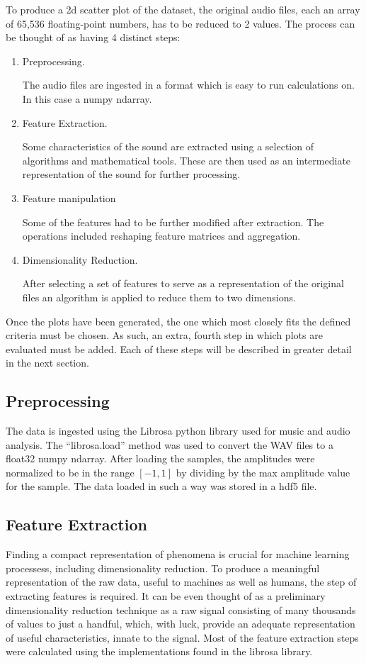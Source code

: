 \documentclass[11pt]{article}
\begin{document}
To produce a 2d scatter plot of the dataset, the original audio files, each an array of 65,536 floating-point numbers, has to be reduced to 2 values.
The process can be thought of as having 4 distinct steps:
\begin{enumerate}
\item Preprocessing.

The audio files are ingested in a format which is easy to run calculations on. In this case a numpy ndarray.
\item Feature Extraction.

Some characteristics of the sound are extracted using a selection of algorithms and mathematical tools. These are then used as an intermediate representation of the sound for further processing.
\item Feature manipulation

Some of the features had to be further modified after extraction. The operations included reshaping feature matrices and aggregation.
\item Dimensionality Reduction.

After selecting a set of features to serve as a representation of the original files an algorithm is applied to reduce them to two dimensions.
\end{enumerate}
Once the plots have been generated, the one which most closely fits the defined criteria must be chosen. As such, an extra, fourth step in which plots are evaluated must be added. Each of these steps will be described in greater detail in the next section.

\subsection{Preprocessing}
\label{sec:orgb842c72}

The data is ingested using the Librosa python library \cite{brian_mcfee_2020_3955228} used for music and audio analysis. The ``librosa.load'' method was used to convert the WAV files to a float32 numpy ndarray. After loading the samples, the amplitudes were normalized to be in the range \([-1, 1]\) by dividing by the max amplitude value for the sample. The data loaded in such a way was stored in a hdf5 file.

\subsection{Feature Extraction}
\label{sec:org48d39d9}

Finding a compact representation of phenomena is crucial for machine learning processess, including dimensionality reduction. To produce a meaningful representation of the raw data, useful to machines as well as humans, the step of extracting features is required. It can be even thought of as a preliminary dimensionality reduction technique as a raw signal consisting of many thousands of values to just a handful, which, with luck, provide an adequate representation of useful characteristics, innate to the signal. Most of the feature extraction steps were calculated using the implementations found in the librosa library.
\end{document}
